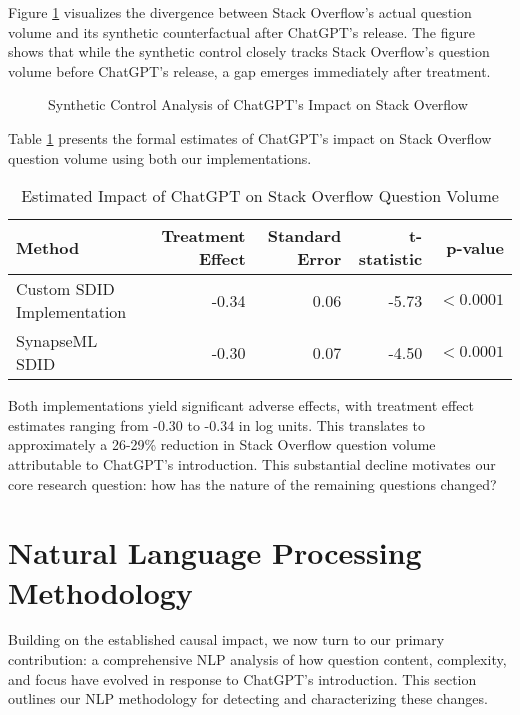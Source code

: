 Figure \ref{fig:synthetic_control} visualizes the divergence between Stack Overflow's actual question volume and its synthetic counterfactual after ChatGPT's release. The figure shows that while the synthetic control closely tracks Stack Overflow's question volume before ChatGPT's release, a gap emerges immediately after treatment.

\begin{figure}[htpb!]
    \centering
    
    \caption{Synthetic Control Analysis of ChatGPT's Impact on Stack Overflow}
    \label{fig:synthetic_control}
\end{figure}

Table \ref{tab:results} presents the formal estimates of ChatGPT's impact on Stack Overflow question volume using both our implementations.

\begin{table}[htpb!]
\centering
    \begin{tabular}{lrrrr}
        \toprule
        \textbf{Method} & \textbf{Treatment Effect} & \textbf{Standard Error} & \textbf{t-statistic} & \textbf{p-value} \\
        \midrule
        Custom SDID Implementation & -0.34 & 0.06 & -5.73 & $<0.0001$ \\
        SynapseML SDID & -0.30 & 0.07 & -4.50 & $<0.0001$ \\
        \bottomrule
    \end{tabular}
    \caption{Estimated Impact of ChatGPT on Stack Overflow Question Volume}
    \label{tab:results}
\end{table}

Both implementations yield significant adverse effects, with treatment effect estimates ranging from -0.30 to -0.34 in log units. This translates to approximately a 26-29\% reduction in Stack Overflow question volume attributable to ChatGPT's introduction. This substantial decline motivates our core research question: how has the nature of the remaining questions changed?

\section{Natural Language Processing Methodology}
\label{sec:nlp_methodology}

Building on the established causal impact, we now turn to our primary contribution: a comprehensive NLP analysis of how question content, complexity, and focus have evolved in response to ChatGPT's introduction. This section outlines our NLP methodology for detecting and characterizing these changes.

